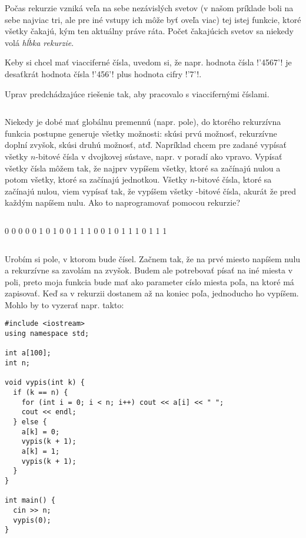 Počas rekurzie vzniká veľa na sebe  nezávislých svetov (v našom príklade boli na sebe najviac tri, 
ale pre iné vstupy ich môže byť oveľa viac) tej istej funkcie, ktoré všetky čakajú, kým ten 
aktuálny práve ráta. Počet čakajúcich svetov sa niekedy volá {\em hĺbka rekurzie}.


Keby si chcel mať viacciferné čísla, uvedom si, že napr. hodnota čísla \prg!'4567'! je
desaťkrát hodnota čísla \prg!'456'! plus hodnota cifry \prg!'7'!.

\begin{uloha}
  Uprav predchádzajúce riešenie tak, aby pracovalo s viaccifernými číslami.
\end{uloha}


\begin{column}{0.6}
Niekedy je dobé mať globálnu premennú (napr. pole), do ktorého rekurzívna funkcia 
postupne generuje všetky možnosti: skúsi prvú možnosť, rekurzívne doplní zvyšok, skúsi
druhú možnosť, atď. Napríklad chcem pre zadané   vypísať všetky
$n$-bitové čísla v dvojkovej sústave, napr. v poradí ako vpravo.
Vypísať všetky čísla môžem tak, že najprv vypíšem všetky, ktoré sa začínajú nulou a potom
všetky, ktoré sa začínajú jednotkou. Všetky $n$-bitové čísla, ktoré sa začínajú nulou, viem
vypísať tak, že vypíšem všetky -bitové čísla, akurát že pred každým napíšem nulu.
Ako to naprogramovať pomocou rekurzie? 
\end{column}\hfill\begin{column}{0.3}
\begin{outputBox}
0 0 0 
0 0 1 
0 1 0 
0 1 1 
1 0 0 
1 0 1 
1 1 0 
1 1 1 
\end{outputBox}
\end{column}

Urobím si pole, v ktorom bude  čísel. 
Začnem tak, že na prvé miesto napíšem nulu a rekurzívne sa zavolám na zvyšok. Budem ale potrebovať
písať na iné miesta v poli, preto moja funkcia bude mať ako parameter císlo miesta poľa, na ktoré
má zapisovať. Keď sa v rekurzii dostanem až na koniec poľa, jednoducho ho vypíšem. Mohlo by to 
vyzerať napr. takto:

\begin{lstlisting}
#include <iostream>
using namespace std;

int a[100];
int n;

void vypis(int k) {
  if (k == n) {
    for (int i = 0; i < n; i++) cout << a[i] << " ";
    cout << endl;
  } else {
    a[k] = 0;
    vypis(k + 1);
    a[k] = 1;
    vypis(k + 1);
  }
}

int main() {
  cin >> n;
  vypis(0);
}
\end{lstlisting}

